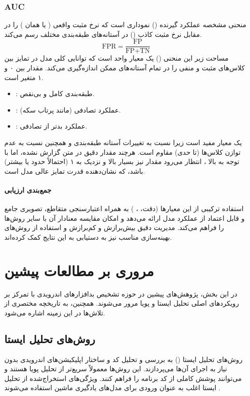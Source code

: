 \subsubsection{AUC }
منحنی مشخصه عملکرد گیرنده () نموداری است که نرخ مثبت واقعی ( یا همان ) را در مقابل نرخ مثبت کاذب () در آستانه‌های طبقه‌بندی مختلف رسم می‌کند.
\[ \text{FPR} = \frac{\text{FP}}{\text{FP} + \text{TN}} \]
مساحت زیر این منحنی () یک معیار واحد است که توانایی کلی مدل در تمایز بین کلاس‌های مثبت و منفی را در تمام آستانه‌های ممکن اندازه‌گیری می‌کند. مقدار  بین ۰ و ۱ متغیر است.
\begin{itemize}
    \item {}: طبقه‌بندی کامل و بی‌نقص.
    \item {}: عملکرد تصادفی (مانند پرتاب سکه).
    \item {}: عملکرد بدتر از تصادفی.
\end{itemize}
 یک معیار مفید است زیرا نسبت به تغییرات آستانه طبقه‌بندی و همچنین نسبت به عدم توازن کلاس‌ها (تا حدی) مقاوم است. هرچند مقدار دقیق  در متن گزارش نشده، اما با توجه به  بالا ، انتظار می‌رود مقدار  نیز بسیار بالا و نزدیک به ۱ (احتمالاً حدود  یا بیشتر) باشد، که نشان‌دهنده قدرت تمایز عالی مدل  است.

\paragraph{جمع‌بندی ارزیابی}
استفاده ترکیبی از این معیارها (دقت، ، ) به همراه اعتبارسنجی متقاطع، تصویری جامع و قابل اعتماد از عملکرد مدل  ارائه می‌دهد و امکان مقایسه معنادار آن با سایر روش‌ها را فراهم می‌کند. مدیریت دقیق بیش‌برازش و کم‌برازش و استفاده از روش‌های بهینه‌سازی مناسب نیز به دستیابی به این نتایج کمک کرده‌اند.

\section{مروری بر مطالعات پیشین}
در این بخش، پژوهش‌های پیشین در حوزه تشخیص بدافزارهای اندرویدی با تمرکز بر رویکردهای اصلی تحلیل ایستا و پویا مرور می‌شوند. همچنین، به تاریخچه مختصری از تلاش‌ها در این زمینه اشاره می‌شود.

\subsection{روش‌های تحلیل ایستا}
روش‌های تحلیل ایستا () به بررسی و تحلیل کد و ساختار اپلیکیشن‌های اندرویدی بدون نیاز به اجرای آن‌ها می‌پردازند. این روش‌ها معمولاً سریع‌تر از تحلیل پویا هستند و می‌توانند پوشش کاملی از کد برنامه را فراهم کنند. ویژگی‌های استخراج‌شده از تحلیل ایستا اغلب به عنوان ورودی برای مدل‌های یادگیری ماشین استفاده می‌شوند \cite{AndroidMalwareSurvey}.

